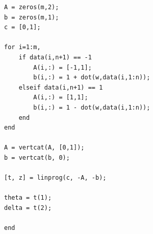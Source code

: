 \begin{enumerate}
\begin{enumerate}
\begin{verbatim}
A = zeros(m,2);
b = zeros(m,1);
c = [0,1];

for i=1:m,
    if data(i,n+1) == -1
        A(i,:) = [-1,1];
        b(i,:) = 1 + dot(w,data(i,1:n));
    elseif data(i,n+1) == 1
        A(i,:) = [1,1];
        b(i,:) = 1 - dot(w,data(i,1:n));
    end         
end

A = vertcat(A, [0,1]);
b = vertcat(b, 0);

[t, z] = linprog(c, -A, -b);

theta = t(1);
delta = t(2);

end
      \end{verbatim} 
      \end{enumerate}
\end{enumerate}



